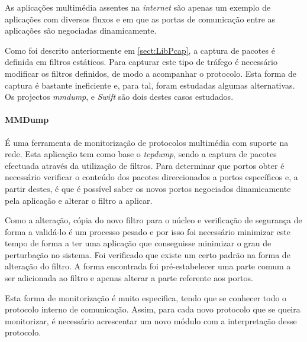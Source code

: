 As aplicações multimédia assentes na \textit{internet} são apenas um exemplo de aplicações com diversos fluxos e em que as portas de comunicação entre as aplicações são negociadas dinamicamente.

Como foi descrito anteriormente em \ref{sect:LibPcap}, a captura de pacotes é definida em filtros estáticos.
Para capturar este tipo de tráfego é necessário modificar os filtros definidos, de modo a acompanhar o protocolo.
Esta forma de captura é bastante ineficiente e, para tal, foram estudadas algumas alternativas. Os projectos \textit{mmdump}\cite{505678}, %
e \textit{Swift}\cite{1387609} são dois destes casos estudados.

\paragraph*{MMDump} É uma ferramenta de monitorização de protocolos multimédia com suporte na rede.
Esta aplicação tem como base o \textit{tcpdump}, sendo a captura de pacotes efectuada através da utilização de filtros.
Para determinar que portos obter é necessário verificar o conteúdo dos pacotes direccionados a portos específicos e, a partir destes, é que é possível saber os novos portos negociados dinamicamente pela aplicação e alterar o filtro a aplicar. 

Como a alteração, cópia do novo filtro para o núcleo e verificação de segurança de forma a validá-lo é um processo pesado e por isso foi necessário minimizar este tempo de forma a ter uma aplicação que conseguisse minimizar o grau de perturbação no sistema.
Foi verificado que existe um certo padrão na forma de alteração do filtro.
A forma encontrada foi pré-estabelecer uma parte comum a ser adicionada ao filtro e apenas alterar a parte referente aos portos.

Esta forma de monitorização é muito especifica, tendo que se conhecer todo o protocolo interno de comunicação.
Assim, para cada novo protocolo que se queira monitorizar, é necessário acrescentar um novo módulo com a interpretação desse protocolo.


